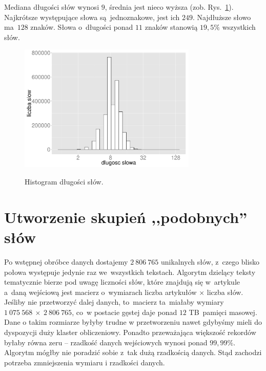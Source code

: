 \documentclass{praca1}
\begin{document}
Mediana długości słów wynosi $9$, średnia jest nieco wyższa (zob. Rys.~\ref{plot:003}). Najkrótsze występujące słowa są~jednoznakowe, jest ich $249$. Najdłuższe słowo ma~$128$ znaków. Słowa o~długości ponad $11$ znaków stanowią $19,5\%$ wszystkich słów.

\begin{figure}[!h]
  \centering
  \includegraphics[width=240pt]{plot3.pdf}\\
  \caption{Histogram długości słów.}\label{plot:003}
\end{figure}


\section{Utworzenie skupień ,,podobnych'' słów}

Po wstępnej obróbce danych dostajemy $2\ 806\ 765$ unikalnych słów, z~czego blisko połowa występuje jedynie raz we~wszystkich tekstach. Algorytm dzielący teksty tematycznie bierze pod uwagę liczności słów, które znajdują się w~artykule a~daną wejściową jest macierz o~wymiarach liczba artykułów $\times$ liczba słów. Jeśliby nie przetworzyć dalej danych, to~macierz ta~miałaby wymiary $1\ 075\ 568\ \times\ 2\ 806\ 765$, co~w postacie gęstej daje ponad $12$ TB~pamięci masowej. Dane o takim rozmiarze byłyby trudne w przetworzeniu nawet gdybyśmy mieli do dyspozycji duży klaster obliczeniowy. Ponadto przeważająca większość rekordów byłaby równa zeru -- rzadkość danych wejściowych wynosi ponad $99,99\%$. Algorytm mógłby nie poradzić sobie z~tak dużą rzadkością danych. Stąd zachodzi potrzeba zmniejszenia wymiaru i rzadkości danych.
\end{document}
